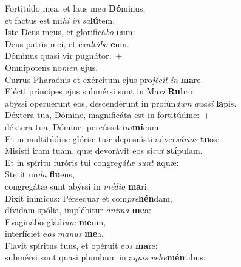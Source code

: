 \evenverse Fortitúdo mea, et laus me\textit{a} \textbf{Dó}minus,~\*\\
\evenverse et factus est mi\textit{hi} \textit{in} \textit{sa}\textbf{lú}tem.\\
\oddverse Iste Deus meus, et glorificá\textit{bo} \textbf{e}um:~\*\\
\oddverse Deus patris mei, et e\textit{xal}\textit{tá}\textit{bo} \textbf{e}um.\\
\evenverse Dóminus quasi vir pugnátor,~+\\
\evenverse  Omnípotens no\textit{men} \textbf{e}jus.~\*\\
\evenverse Currus Pharaónis et exércitum ejus pro\textit{jé}\textit{cit} \textit{in} \textbf{ma}re.\\
\oddverse Elécti príncipes ejus submérsi sunt in Ma\textit{ri} \textbf{Ru}bro:~\*\\
\oddverse abýssi operuérunt eos, descendérunt in profún\textit{dum} \textit{qua}\textit{si} \textbf{la}pis.\\
\evenverse Déxtera tua, Dómine, magnificáta est in fortitúdine:~+\\
\evenverse  déxtera tua, Dómine, percússit i\textit{ni}\textbf{mí}cum.~\*\\
\evenverse Et in multitúdine glóriæ tuæ deposuísti adver\textit{sá}\textit{ri}\textit{os} \textbf{tu}os:\\
\oddverse Misísti iram tuam, quæ devorávit eos si\textit{cut} \textbf{stí}pulam.~\*\\
\oddverse Et in spíritu furóris tui congre\textit{gá}\textit{tæ} \textit{sunt} \textbf{a}quæ:\\
\evenverse Stetit un\textit{da} \textbf{flu}ens,~\*\\
\evenverse congregátæ sunt abýssi in \textit{mé}\textit{di}\textit{o} \textbf{ma}ri.\\
\oddverse Dixit inimícus: Pérsequar et com\textit{pre}\textbf{hén}dam,~\*\\
\oddverse dívidam spólia, implébitur \textit{á}\textit{ni}\textit{ma} \textbf{me}a:\\
\evenverse Evaginábo gládi\textit{um} \textbf{me}um,~\*\\
\evenverse interfíciet e\textit{os} \textit{ma}\textit{nus} \textbf{me}a.\\
\oddverse Flavit spíritus tuus, et opéruit e\textit{os} \textbf{ma}re:~\*\\
\oddverse submérsi sunt quasi plumbum in a\textit{quis} \textit{ve}\textit{he}\textbf{mén}tibus.\\
